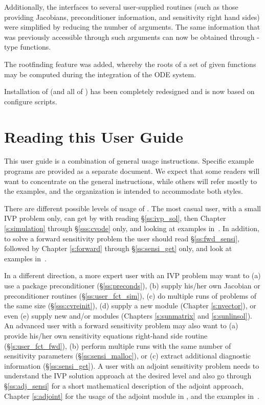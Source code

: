 Additionally, the interfaces to several user-supplied routines
(such as those providing Jacobians, preconditioner information, and
sensitivity right hand sides) were simplified by reducing the number
of arguments. The same information that was previously accessible
through such arguments can now be obtained through {-type}
functions.

The rootfinding feature was added, whereby the roots of a set of given
functions may be computed during the integration of the ODE system.

Installation of {\cvodes} (and all of {\sundials}) has been completely
redesigned and is now based on configure scripts.


\section{Reading this User Guide}\label{ss:reading}

This user guide is a combination of general usage instructions.
Specific example programs are provided as a separate document.
We expect that some readers will want to
concentrate on the general instructions, while others will refer
mostly to the examples, and the organization is intended to
accommodate both styles.

There are different possible levels of usage of {\cvodes}. The most
casual user, with a small IVP problem only, can get by with reading
\S\ref{ss:ivp_sol}, then Chapter \ref{s:simulation} through
\S\ref{sss:cvode} only, and looking at examples in~\cite{cvodes_ex}.
In addition, to solve a forward sensitivity problem the user should read
\S\ref{ss:fwd_sensi}, followed by Chapter \ref{s:forward} through
\S\ref{ss:sensi_get} only, and look at examples in~\cite{cvodes_ex}.

In a different direction, a more expert user with an IVP problem may want to
(a) use a package preconditioner (\S\ref{ss:preconds}),
(b) supply his/her own Jacobian or preconditioner routines (\S\ref{ss:user_fct_sim}),
(c) do multiple runs of problems of the same size (\S\ref{sss:cvreinit}),
(d) supply a new {\nvector} module (Chapter \ref{s:nvector}), or even
(e) supply new {\sunlinsol} and/or {\sunmatrix} modules (Chapters
\ref{s:sunmatrix} and \ref{s:sunlinsol}).
%
An advanced user with a forward sensitivity problem may also want to
(a) provide his/her own sensitivity equations right-hand side routine
(\S\ref{s:user_fct_fwd}), (b) perform multiple runs with the same number of
sensitivity parameters (\S\ref{ss:sensi_malloc}), or (c) extract additional
diagnostic information (\S\ref{ss:sensi_get}).
%
A user with an adjoint sensitivity problem needs to understand the IVP
solution approach at the desired level and also go through
\S\ref{ss:adj_sensi} for a short mathematical description of the adjoint
approach, Chapter \ref{s:adjoint} for the usage of the adjoint module in {\cvodes},
and the examples in~\cite{cvodes_ex}.

